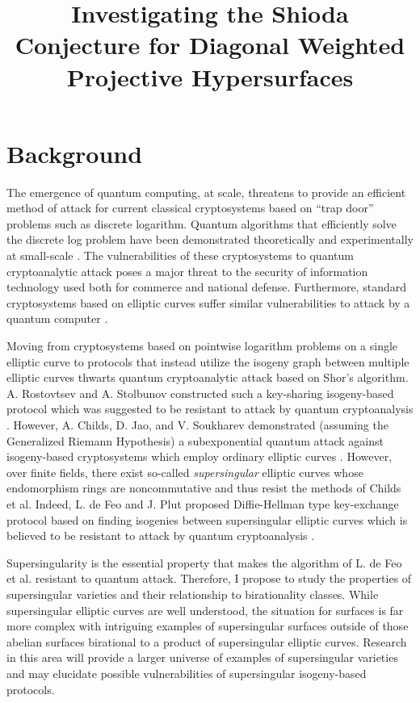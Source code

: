 \documentclass[12pt]{amsart}
\begin{document}
\thispagestyle{fancy}

\title{Investigating the Shioda Conjecture for Diagonal Weighted Projective Hypersurfaces}
\maketitle

\section*{Background}
The emergence of quantum computing, at scale, threatens to provide an efficient method of attack for current classical cryptosystems based on ``trap door'' problems such as discrete logarithm. Quantum algorithms that efficiently solve the discrete log problem have been demonstrated theoretically and experimentally at small-scale \cite{ekeraa2017quantum, Monz1068}. The vulnerabilities of these cryptosystems to quantum cryptoanalytic attack poses a major threat to the security of information technology used both for commerce and national defense. Furthermore, standard cryptosystems based on elliptic curves suffer similar vulnerabilities to attack by a quantum computer \cite{proos2003shor}.

Moving from cryptosystems based on pointwise logarithm problems on a single elliptic curve to protocols that instead utilize the isogeny graph between multiple elliptic curves thwarts quantum cryptoanalytic attack based on Shor's algorithm. A. Rostovtsev and A. Stolbunov constructed such a key-sharing isogeny-based protocol which was suggested to be resistant to attack by quantum cryptoanalysis \cite{rostovtsev2006public}. However, A. Childs, D. Jao, and V. Soukharev demonstrated (assuming the Generalized Riemann Hypothesis) a subexponential quantum attack against isogeny-based cryptosystems which employ ordinary elliptic curves \cite{childs2014constructing}. However, over finite fields, there exist so-called \textit{supersingular} elliptic curves whose endomorphism rings are noncommutative and thus resist the methods of Childs et al. Indeed, L. de Feo and J. Plut proposed Diffie-Hellman type key-exchange protocol based on finding isogenies between supersingular elliptic curves which is believed to be resistant to attack by quantum cryptoanalysis \cite{feo_supersingular_isogeny_crypto}.

Supersingularity is the essential property that makes the algorithm of L. de Feo et al. resistant to quantum attack. Therefore, I propose to study the properties of supersingular varieties and their relationship to birationality classes. While supersingular elliptic curves are well understood, the situation for surfaces is far more complex with intriguing examples of supersingular surfaces outside of those abelian surfaces birational to a product of supersingular elliptic curves. Research in this area will provide a larger universe of examples of supersingular varieties and may elucidate possible vulnerabilities of supersingular isogeny-based protocols.
\end{document}
